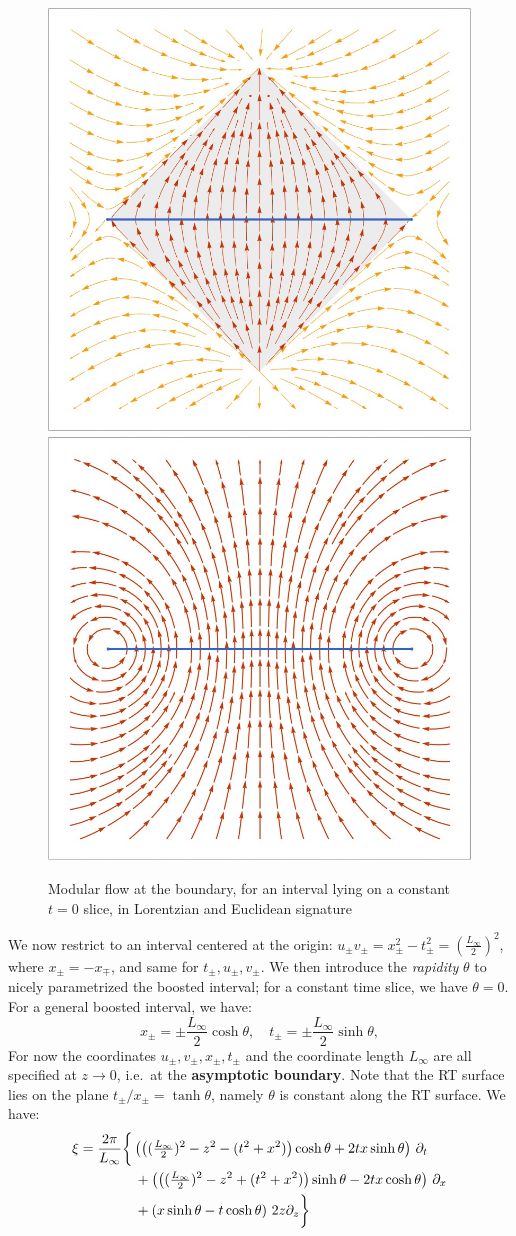\documentclass[11pt,a4paper,utf8]{article}
\begin{document}
	\begin{figure}[!ht]
	\centering
	\includegraphics[width=.4\linewidth]{img/modFlowLorentzian.png}
	\hspace{2em}
	\includegraphics[width=.4\linewidth]{img/modFlowEuclidean.png}
	\caption{Modular flow at the boundary, for an interval lying on a constant $t = 0$ slice, in Lorentzian and Euclidean signature}
	\end{figure}
	
\pagebreak[4]
	
	We now restrict to an interval centered at the origin: $
		u_\pm v_\pm
		= x^2_\pm - t^2_\pm
		= (\frac{L_\infty}{2})^2
	$, where $x_\pm = -x_\mp$, and same for $t_\pm, u_\pm, v_\pm$. 
	We then introduce the \textit{rapidity} $\theta$ to nicely parametrized the boosted interval; for a constant time slice, we have $\theta = 0$. For a general boosted interval, we have:
	\begin{equation}
		x_\pm = \pm \frac{L_\infty}{2} \cosh \theta,
	\quad
		t_\pm = \pm \frac{L_\infty}{2} \sinh \theta,
	\end{equation}
	For now the coordinates $u_\pm, v_\pm, x_\pm, t_\pm$ and the coordinate length $L_\infty$ are all specified at $z\to 0$, i.e.~at the \textbf{asymptotic boundary}. Note that the RT surface lies on the plane $
		t_\pm / x_\pm = \tanh \theta
	$, namely $\theta$ is constant along the RT surface. 
	We have:
	\begin{gather}
	\begin{aligned}
		\xi &= \frac{2\pi}{L_\infty} \bigg\{
			\left(
				\left(
					(\tfrac{L_\infty}{2})^2 - z^2
					- (t^2 + x^2)
				\right) \cosh\theta
				+ 2tx \sinh\theta
			\right) \,\partial_{t}
		\\ &\qquad\qquad 
			+ \left(
				\left(
					(\tfrac{L_\infty}{2})^2 - z^2
					+ (t^2 + x^2)
				\right) \sinh\theta
				- 2tx \cosh\theta
			\right) \,\partial_{x}
		\\ &\qquad\qquad 
			+ \left(
				x\sinh\theta
				- t\cosh\theta
			\right) \,2z\partial_{z}
		\bigg\}
	\end{aligned}
	\end{gather}
	
\end{document}
